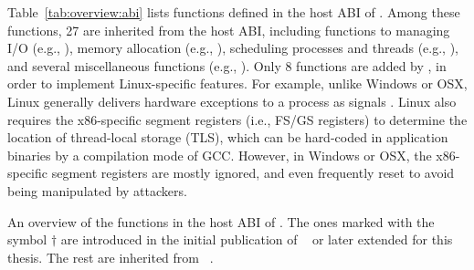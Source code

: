 Table~\ref{tab:overview:abi} lists \palcalls{} functions defined in the host ABI of \graphene{}.
Among these functions, 
27 are inherited from the \drawbridge{} host ABI,
including functions to managing I/O (e.g., ), memory allocation (e.g., ), scheduling processes and threads (e.g., ), and several miscellaneous functions (e.g., ).
Only 8 functions are added by \graphene{}, in order to implement Linux-specific features.
For example, unlike Windows or OSX, Linux generally
delivers hardware exceptions to a process as signals .
Linux also requires 
the x86-specific segment registers (i.e., FS/GS registers)
to determine the location of thread-local storage (TLS), which can be hard-coded in application binaries by a compilation mode of GCC.
However, in Windows or OSX, the x86-specific segment registers are mostly ignored, and even frequently reset to avoid being manipulated by attackers.




\begin{table}[htp!]
\centering

\caption{An overview of the \palcalls{} functions in the host ABI of \graphene{}. The ones marked with the symbol $\dagger$ are introduced in the initial publication of \graphene{}~\cite{tsai14graphene} or later extended for this thesis. The rest are inherited from \drawbridge{}~\cite{porter11drawbridge}.}
\label{tab:overview:abi}
\end{table}

